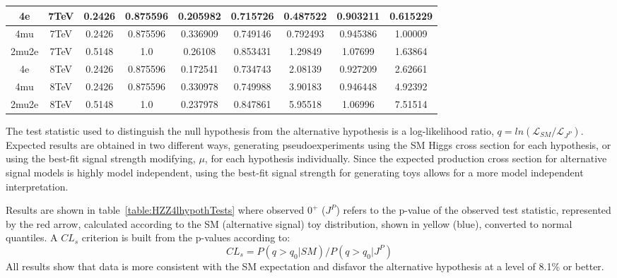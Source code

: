 \begin{table}[b]
\begin{tabular}{c c c c c c c c c}
4e & 7TeV & 0.2426 & 0.875596 & 0.205982 & 0.715726
 & 0.487522%
 & 0.903211 & 0.615229 \\ \hline 4mu & 7TeV & 0.2426 & 0.875596 & 0.336909 & 0.749146
 & 0.792493%
 & 0.945386 & 1.00009 \\ \hline 2mu2e & 7TeV & 0.5148 & 1.0  & 0.26108 & 0.853431
 & 1.29849%
 & 1.07699 & 1.63864 \\ \hline \hline 
4e & 8TeV & 0.2426 & 0.875596 & 0.172541 & 0.734743
 & 2.08139%
 & 0.927209 & 2.62661 \\ \hline 4mu & 8TeV & 0.2426 & 0.875596 & 0.330978 & 0.749988
 & 3.90183%
 & 0.946448 & 4.92392 \\ \hline 2mu2e & 8TeV & 0.5148 & 1.0  & 0.237978 & 0.847861
 & 5.95518%
 & 1.06996 & 7.51514 \\ \hline \hline 
\end{tabular}
\label{table:HZZ4lyieldcorr_spin2_HD}
\end{table}

The test statistic used to distinguish the null hypothesis from
the alternative hypothesis is a log-likelihood ratio,  
$q=ln(\mathscr{L}_{SM}/\mathscr{L}_{J^P})$. Expected results are
obtained in two different ways, generating pseudoexperiments using
the SM Higgs cross section for each hypothesis, 
or using the best-fit signal strength modifying, $\mu$, for each
hypothesis individually.  Since the expected production cross 
section for alternative signal 
models is highly model independent, using the best-fit signal
strength for generating toys allows for a more model independent 
interpretation.

Results are shown in 
table~\ref{table:HZZ4lhypothTests} where observed $0^+$ ($J^P$) 
refers to the p-value 
of the observed test statistic, represented by the red arrow,
calculated according to the SM (alternative signal) toy 
distribution, shown in yellow (blue), converted to normal 
quantiles.  A $CL_s$ criterion is built from the p-values 
according to:
\begin{equation}
CL_s = P(q>q_0|SM)/P(q>q_0|J^P)
\end{equation}  
All results show that data is more consistent with 
the SM expectation and disfavor the alternative hypothesis
at a level of 8.1\% or better.  

